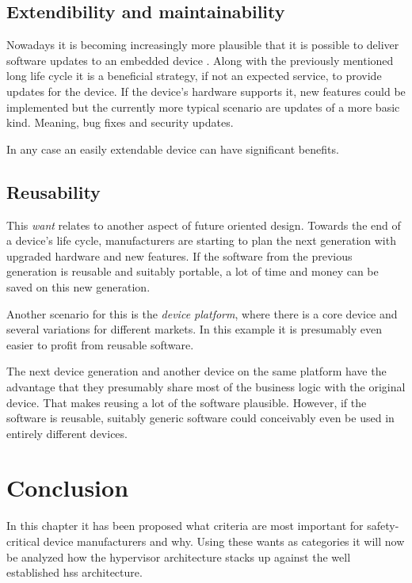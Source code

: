 \subsection{Extendibility and maintainability}
Nowadays it is becoming increasingly more plausible that it is possible to deliver software updates to an embedded device \cite{OndrejKachman.2016}. Along with the previously mentioned long life cycle it is a beneficial strategy, if not an expected service, to provide updates for the device.
If the device's hardware supports it, new features could be implemented but the currently more typical scenario are updates of a more basic kind. Meaning, bug fixes and security updates.

In any case an easily extendable device can have significant benefits.
\subsection{Reusability}
This \textit{want} relates to another aspect of future oriented design. Towards the end of a device's life cycle, manufacturers are starting to plan the next generation with upgraded hardware and new features. If the software from the previous generation is reusable and suitably portable, a lot of time and money can be saved on this new generation.

Another scenario for this is the \textit{device platform}, where there is a core device and several variations for different markets. In this example it is presumably even easier to profit from reusable software.

The next device generation and another device on the same platform have the advantage that they presumably share most of the business logic with the original device. That makes reusing a lot of the software plausible. However, if the software is reusable, suitably generic software could conceivably even be used in entirely different devices.

\section{Conclusion}
In this chapter it has been proposed what criteria are most important for safety-critical device manufacturers and why. Using these wants as categories it will now be analyzed how the hypervisor architecture stacks up against the well established \acrshort{hss} architecture.